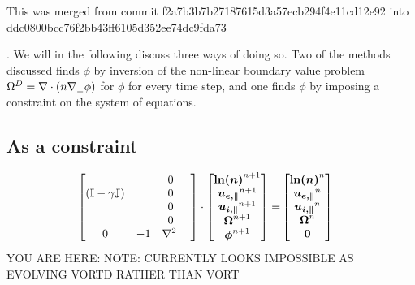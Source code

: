 This was merged from commit
f2a7b3b7b27187615d3a57ecb294f4e11cd12e92
into
ddc0800bcc76f2bb43ff6105d352ee74dc9fda73

.
We will in the following discuss three ways of doing so.
Two of the methods discussed finds $\phi$ by inversion of the non-linear boundary value problem $\Omega^D = \nabla\cdot\left(n\nabla_\perp\phi\right)$ for $\phi$ for every time step, and one finds $\phi$ by imposing a constraint on the system of equations.

\subsection{As a constraint}
%
\begin{align*}
    \begin{bmatrix}
                                        & & 0  \\
        (\mathbb{I} - \gamma\mathbb{J}) & & 0  \\
                                        & & 0  \\
                                        & & 0  \\
        0                               & -1 & \nabla_\perp^2 & \\
    \end{bmatrix}
    \cdot
    \begin{bmatrix}
        \boldsymbol{\ln(n)}^{n+1}  \\
        \boldsymbol{u_{e,\|}}^{n+1}\\
        \boldsymbol{u_{i,\|}}^{n+1}\\
        \boldsymbol{\Omega}^{n+1}     \\
        \boldsymbol{\phi}^{n+1}    \\
    \end{bmatrix}
    =&
    \begin{bmatrix}
        \boldsymbol{\ln(n)}^{n}  \\
        \boldsymbol{u_{e,\|}}^{n}\\
        \boldsymbol{u_{i,\|}}^{n}\\
        \boldsymbol{\Omega}^{n}     \\
        \boldsymbol{0}           \\
    \end{bmatrix}
\end{align*}
%
YOU ARE HERE:
NOTE: CURRENTLY LOOKS IMPOSSIBLE AS EVOLVING VORTD RATHER THAN VORT
